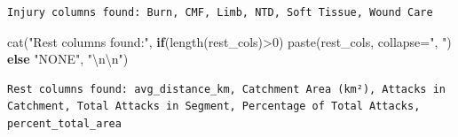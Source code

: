 \documentclass[
  letterpaper,
  DIV=11,
  numbers=noendperiod]{scrartcl}
\newenvironment{Shaded}{\begin{snugshade}}{\end{snugshade}}
\newcommand{\AttributeTok}[1]{\textcolor[rgb]{0.40,0.45,0.13}{#1}}
\newcommand{\ControlFlowTok}[1]{\textcolor[rgb]{0.00,0.23,0.31}{\textbf{#1}}}
\newcommand{\DecValTok}[1]{\textcolor[rgb]{0.68,0.00,0.00}{#1}}
\newcommand{\FunctionTok}[1]{\textcolor[rgb]{0.28,0.35,0.67}{#1}}
\newcommand{\NormalTok}[1]{\textcolor[rgb]{0.00,0.23,0.31}{#1}}
\newcommand{\SpecialCharTok}[1]{\textcolor[rgb]{0.37,0.37,0.37}{#1}}
\newcommand{\StringTok}[1]{\textcolor[rgb]{0.13,0.47,0.30}{#1}}
\begin{document}
\begin{verbatim}
Injury columns found: Burn, CMF, Limb, NTD, Soft Tissue, Wound Care 
\end{verbatim}

\begin{Shaded}
\begin{Highlighting}[]
\FunctionTok{cat}\NormalTok{(}\StringTok{"Rest columns found:"}\NormalTok{, }\ControlFlowTok{if}\NormalTok{(}\FunctionTok{length}\NormalTok{(rest\_cols)}\SpecialCharTok{\textgreater{}}\DecValTok{0}\NormalTok{) }\FunctionTok{paste}\NormalTok{(rest\_cols, }\AttributeTok{collapse=}\StringTok{", "}\NormalTok{) }\ControlFlowTok{else} \StringTok{"NONE"}\NormalTok{, }\StringTok{"}\SpecialCharTok{\textbackslash{}n\textbackslash{}n}\StringTok{"}\NormalTok{)}
\end{Highlighting}
\end{Shaded}

\begin{verbatim}
Rest columns found: avg_distance_km, Catchment Area (km²), Attacks in Catchment, Total Attacks in Segment, Percentage of Total Attacks, percent_total_area 
\end{verbatim}
\end{document}
